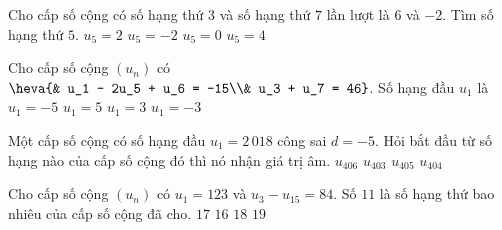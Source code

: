 \begin{ex}%
	Cho cấp  số cộng có số hạng thứ $3$ và số hạng thứ $7$ lần lượt là $6$ và $-2$. Tìm số hạng thứ $5$.
	 \choice
		 {\True $u_5=2$}
		{$u_5=-2$} 
		{$u_5=0$} 
		{$u_5=4$} 
\end{ex}

\begin{ex}%
	Cho cấp số cộng $(u_n)$ có $\heva  {& u_1 - 2u_5 + u_6 = -15\\& u_3 + u_7 = 46}$. Số hạng đầu $u_1$ là
	\choice 
		 {$u_1 = -5$}
		{$u_1 =  5$}
		 {\True $u_1 = 3$}
		{$u_1 =  -3$}
\end{ex}

\begin{ex}%
	Một cấp số cộng có số hạng đầu $u_1 = 2\,018$ công sai $d = -5$. Hỏi bắt  đầu từ số hạng nào của cấp số cộng đó thì nó nhận giá trị âm.
	 \choice
		 {$u_{406}$}
		{$u_{403}$} 
		{\True $u_{405}$} 
		{$u_{404}$} 
\end{ex}

\begin{ex}%
	Cho cấp số cộng $(u_n)$ có $u_1=123$ và $u_3-u_{15}=84$. Số $11$ là số hạng thứ  bao nhiêu của cấp số cộng đã cho.
	 \choice
		 {\True $17$}
		{$16$} 
		{$18$} 
		 {$19$}
\end{ex}

